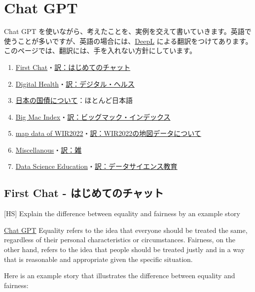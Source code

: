 \documentclass[
]{book}
\providecommand{\tightlist}{%
  \setlength{\itemsep}{0pt}\setlength{\parskip}{0pt}}
\theoremstyle{definition}
\theoremstyle{definition}
\theoremstyle{definition}
\theoremstyle{definition}
\theoremstyle{remark}
\begin{document}
\hypertarget{chatgpt}{%
\chapter{Chat GPT}\label{chatgpt}}

Chat GPT を使いながら、考えたことを、実例を交えて書いていきます。英語で使うことが多いですが、英語の場合には、\href{https://www.deepl.com/translator}{DeepL} による翻訳をつけてあります。このページでは、翻訳には、手を入れない方針にしています。

\begin{enumerate}
\def\labelenumi{\arabic{enumi}.}
\tightlist
\item
  \protect\hyperlink{firstchat}{First Chat}・\protect\hyperlink{firstchatj}{訳：はじめてのチャット}
\item
  \protect\hyperlink{digitalhealth}{Digital Health}・\protect\hyperlink{digitalhealthj}{訳：デジタル・ヘルス}
\item
  \protect\hyperlink{nationalbond}{日本の国債について}：ほとんど日本語
\item
  \protect\hyperlink{bigmacindex}{Big Mac Index}・\protect\hyperlink{bigmacindexj}{訳：ビッグマック・インデックス}
\item
  \protect\hyperlink{mapdataofwir2022}{map data of WIR2022}・\protect\hyperlink{mapdataofwir2022j}{訳：WIR2022の地図データについて}
\item
  \protect\hyperlink{miscellanous}{Miscellanous}・\protect\hyperlink{miscellanousj}{訳：雑}
\item
  \protect\hyperlink{dseducation}{Data Science Education}・\protect\hyperlink{dseducationj}{訳：データサイエンス教育}
\end{enumerate}

\hypertarget{firstchat}{%
\section{First Chat - はじめてのチャット　}\label{firstchat}}

{[}HS{]} Explain the difference between equality and fairness by an example story

\protect\hyperlink{chatgpt}{Chat GPT} Equality refers to the idea that everyone should be treated the same, regardless of their personal characteristics or circumstances. Fairness, on the other hand, refers to the idea that people should be treated justly and in a way that is reasonable and appropriate given the specific situation.

Here is an example story that illustrates the difference between equality and fairness:
\end{document}
